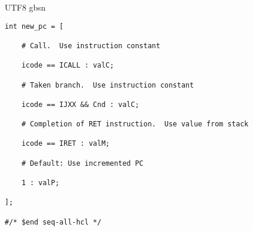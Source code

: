 \documentclass {article}
\begin{document}
\begin {CJK*} {UTF8} {gbsn}
\begin{lstlisting}
int new_pc = [

	# Call.  Use instruction constant

	icode == ICALL : valC;

	# Taken branch.  Use instruction constant

	icode == IJXX && Cnd : valC;

	# Completion of RET instruction.  Use value from stack

	icode == IRET : valM;

	# Default: Use incremented PC

	1 : valP;

];

#/* $end seq-all-hcl */
				\end{lstlisting}

  \end {CJK*}
\end{document}
